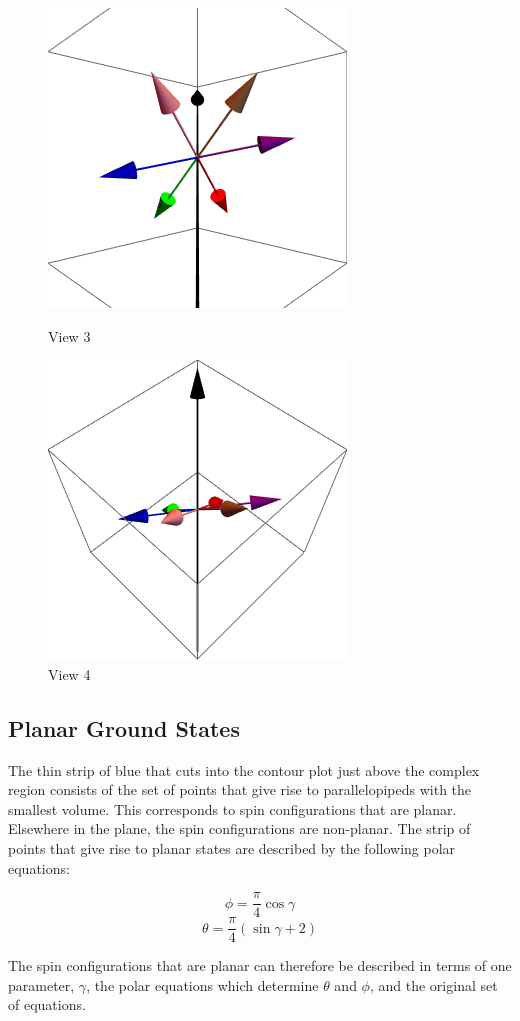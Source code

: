 \begin{figure}
\begin{minipage}[b]{0.5\linewidth}
  \end{minipage} 
  \begin{minipage}[b]{0.5\linewidth}
    \centering
    \includegraphics[width=.5\linewidth]{img/th2-3108_phi0-27_view3.png} 
    \caption{View 3} 
    \vspace{4ex}
  \end{minipage}%
  \begin{minipage}[b]{0.5\linewidth}
    \centering
    \includegraphics[width=.5\linewidth]{img/th2-3108_phi0-27_view4.png} 
    \caption{View 4} 
    \vspace{4ex}
  \end{minipage} 
\end{figure}

\clearpage
\subsection{Planar Ground States}

The thin strip of blue that cuts into the contour plot just above the complex region consists of the set of points that give rise to parallelopipeds with the smallest volume. This corresponds to spin configurations that are planar. Elsewhere in the plane, the spin configurations are non-planar. The strip of points that give rise to planar states are described by the following polar equations:

\begin{equation}
\phi = \frac{\pi}{4}\cos{\gamma} 
\end{equation}
\begin{equation}
\theta = \frac{\pi}{4}(\sin{\gamma}+2)
\end{equation}

The spin configurations that are planar can therefore be described in terms of one parameter, $\gamma$, the polar equations which determine $\theta$ and $\phi$, and the original set of equations.  